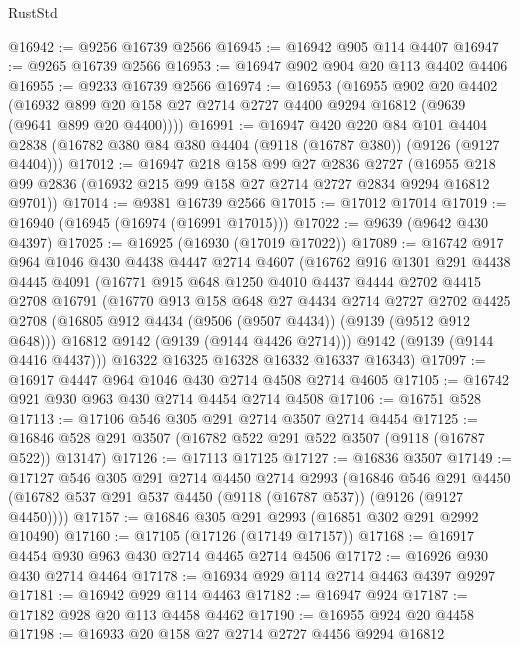 \begin{lexlean}{RustStd}
\begin{coremodule}
@16942 := @9256 @16739 @2566
@16945 := @16942 @905 @114 @4407
@16947 := @9265 @16739 @2566
@16953 := @16947 @902 @904 @20 @113 @4402 @4406
@16955 := @9233 @16739 @2566
@16974 := @16953
    (@16955
      @902
      @20
      @4402
      (@16932 @899 @20 @158 @27 @2714 @2727 @4400 @9294 @16812 (@9639 (@9641 @899 @20 @4400))))
@16991 := @16947
    @420
    @220
    @84
    @101
    @4404
    @2838
    (@16782 @380 @84 @380 @4404 (@9118 (@16787 @380)) (@9126 (@9127 @4404)))
@17012 := @16947
    @218
    @158
    @99
    @27
    @2836
    @2727
    (@16955 @218 @99 @2836 (@16932 @215 @99 @158 @27 @2714 @2727 @2834 @9294 @16812 @9701))
@17014 := @9381 @16739 @2566
@17015 := @17012 @17014
@17019 := @16940 (@16945 (@16974 (@16991 @17015)))
@17022 := @9639 (@9642 @430 @4397)
@17025 := @16925 (@16930 (@17019 @17022))
@17089 := @16742
    @917
    @964
    @1046
    @430
    @4438
    @4447
    @2714
    @4607
    (@16762
      @916
      @1301
      @291
      @4438
      @4445
      @4091
      (@16771
        @915
        @648
        @1250
        @4010
        @4437
        @4444
        @2702
        @4415
        @2708
        @16791
        (@16770
          @913
          @158
          @648
          @27
          @4434
          @2714
          @2727
          @2702
          @4425
          @2708
          (@16805 @912 @4434 (@9506 (@9507 @4434)) (@9139 (@9512 @912 @648)))
          @16812
          @9142
          (@9139 (@9144 @4426 @2714)))
        @9142
        (@9139 (@9144 @4416 @4437)))
      @16322
      @16325
      @16328
      @16332
      @16337
      @16343)
@17097 := @16917 @4447 @964 @1046 @430 @2714 @4508 @2714 @4605
@17105 := @16742 @921 @930 @963 @430 @2714 @4454 @2714 @4508
@17106 := @16751 @528
@17113 := @17106 @546 @305 @291 @2714 @3507 @2714 @4454
@17125 := @16846 @528 @291 @3507 (@16782 @522 @291 @522 @3507 (@9118 (@16787 @522)) @13147)
@17126 := @17113 @17125
@17127 := @16836 @3507
@17149 := @17127
    @546
    @305
    @291
    @2714
    @4450
    @2714
    @2993
    (@16846
      @546
      @291
      @4450
      (@16782 @537 @291 @537 @4450 (@9118 (@16787 @537)) (@9126 (@9127 @4450))))
@17157 := @16846 @305 @291 @2993 (@16851 @302 @291 @2992 @10490)
@17160 := @17105 (@17126 (@17149 @17157))
@17168 := @16917 @4454 @930 @963 @430 @2714 @4465 @2714 @4506
@17172 := @16926 @930 @430 @2714 @4464
@17178 := @16934 @929 @114 @2714 @4463 @4397 @9297
@17181 := @16942 @929 @114 @4463
@17182 := @16947 @924
@17187 := @17182 @928 @20 @113 @4458 @4462
@17190 := @16955 @924 @20 @4458
@17198 := @16933 @20 @158 @27 @2714 @2727 @4456 @9294 @16812

\end{coremodule}
\end{lexlean}
